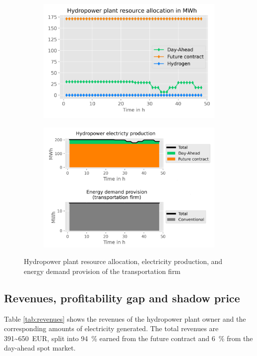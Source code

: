 \documentclass[review]{elsarticle}
\begin{document}
\begin{figure}[h]
	\begin{subfigure}[c]{1\textwidth}
		\centering
		\includegraphics[width=0.8\linewidth]{figures/Ressource allocation.png}
		\label{fig:ressources}
	\end{subfigure}
	\newline
	\newline
	
	\begin{subfigure}[c]{1\textwidth}
		\centering
		\includegraphics[width=0.8\linewidth]{figures/Energy service provision.png}
		\label{fig:provision}
	\end{subfigure}
	\caption{Hydropower plant resource allocation, electricity production, and energy demand provision of the transportation firm}
	\label{fig_results1}
\end{figure}
\cleardoublepage
\subsection{Revenues, profitability gap and shadow price}\label{res:2_gap}
Table \ref{tab:revenues} shows the revenues of the hydropower plant owner and the corresponding amounts of electricity generated. The total revenues are \SI{391~650}{EUR}, split into \SI{94}{\%} earned from the future contract and \SI{6}{\%} from the day-ahead spot market. 
\end{document}
